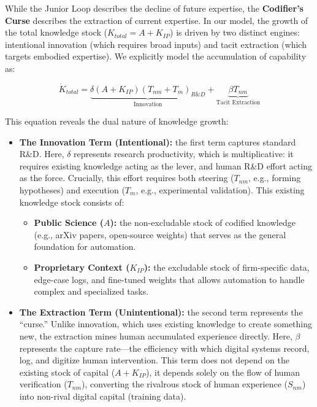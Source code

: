 \documentclass[12pt, letter]{article}
\begin{document}
While the Junior Loop describes the decline of future expertise, the \textbf{Codifier's Curse} describes the extraction of current expertise. In our model, the growth of the total knowledge stock ($K_{total} = A + K_{IP}$) is driven by two distinct engines: intentional innovation (which requires broad inputs) and tacit extraction (which targets embodied expertise). We explicitly model the accumulation of capability as:

\begin{equation}
    \dot{K}_{total} = \underbrace{\delta (A + K_{IP}) (T_{nm} + T_m)_{R\&D}}_{\text{Innovation}} + \underbrace{\beta T_{nm}}_{\text{Tacit Extraction}}
\end{equation}

This equation reveals the dual nature of knowledge growth:

\begin{itemize}
\item \textbf{The Innovation Term (Intentional):} the first term captures standard R\&D. Here, $\delta$ represents research productivity, which is multiplicative: it requires existing knowledge acting as the lever, and human R\&D effort acting as the force. Crucially, this effort requires both steering ($T_{nm}$, e.g., forming hypotheses) and execution ($T_m$, e.g., experimental validation). This existing knowledge stock consists of:
    \begin{itemize}
        \item \textbf{Public Science ($A$):} the non-excludable stock of codified knowledge (e.g., arXiv papers, open-source weights) that serves as the general foundation for automation.
        \item \textbf{Proprietary Context ($K_{IP}$):} the excludable stock of firm-specific data, edge-case logs, and fine-tuned weights that allows automation to handle complex and specialized tasks.
    \end{itemize}
   
    \item \textbf{The Extraction Term (Unintentional):} the second term represents the ``curse.'' Unlike innovation, which uses existing knowledge to create something new, the extraction mines human accumulated experience directly. Here, $\beta$ represents the capture rate—the efficiency with which digital systems record, log, and digitize human intervention. This term does not depend on the existing stock of capital ($A+K_{IP}$), it depends solely on the flow of human verification ($T_{nm}$), converting the rivalrous stock of human experience ($S_{nm}$) into non-rival digital capital (training data).
\end{itemize}
\end{document}
